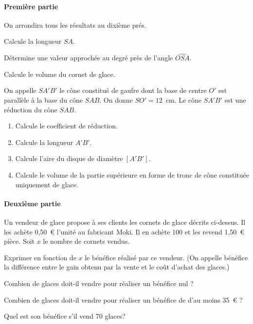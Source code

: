 \par{}
\paragraph{Première partie} On arrondira tous les résultats au dixième
prés.
\begin{myenumerate}
\item Calcule la longueur $SA$.
\item Détermine une valeur approchée au degré près de l'angle $\widehat{OSA}$.
\item Calcule le volume du cornet de glace.
\item On appelle $SA'B'$ le cône constitué de gaufre dont la base de
centre $O'$ est parallèle à la base du cône $SAB$. On donne
$SO'=12$~cm. Le cône $SA'B'$ est une réduction du cône $SAB$.
\begin{enumerate}
\item Calcule le coefficient de réduction.
\item Calcule la longueur $A'B'$.
\item Calcule l'aire du disque de diamètre $[A'B']$.
\item Calcule le volume de la partie supérieure en forme de tronc de
cône constituée uniquement de glace.
\end{enumerate}
\end{myenumerate}
\paragraph{Deuxième partie}
Un vendeur de glace propose à ses clients les cornets de glace décrits
ci-dessus. Il les achète 0,50~\textgreek{\euro} l'unité au fabricant Moki. Il en
achète 100 et les revend 1,50~\textgreek{\euro} pièce. Soit $x$ le nombre de
cornets vendus.
\begin{myenumerate}
\item Exprimer en fonction de $x$ le bénéfice réalisé par ce
vendeur. (On appelle bénéfice la différence entre le gain obtenu par
la vente et le coût d'achat des glaces.)
\item Combien de glaces doit-il vendre pour réaliser un bénéfice nul ?
\item Combien de glaces doit-il vendre pour réaliser un bénéfice de
 d'au moins 35~\textgreek{\euro} ?
\item Quel est son bénéfice s'il vend 70 glaces?
\end{myenumerate}